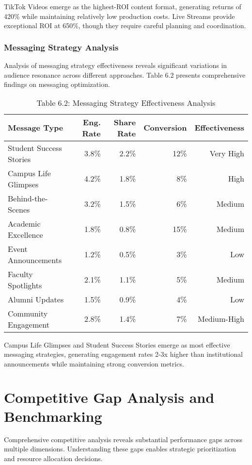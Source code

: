 \documentclass[12pt]{report}
\begin{document}
TikTok Videos emerge as the highest-ROI content format, generating returns of 420\% while maintaining relatively low production costs. Live Streams provide exceptional ROI at 650\%, though they require careful planning and coordination.

\subsection{Messaging Strategy Analysis}

Analysis of messaging strategy effectiveness reveals significant variations in audience resonance across different approaches. Table 6.2 presents comprehensive findings on messaging optimization.

\begin{table}[h]
\centering
\caption{Table 6.2: Messaging Strategy Effectiveness Analysis}
\begin{tabular}{@{}lrrrr@{}}
\toprule
\textbf{Message Type} & \textbf{Eng. Rate} & \textbf{Share Rate} & \textbf{Conversion} & \textbf{Effectiveness} \\
\midrule
Student Success Stories & 3.8\% & 2.2\% & 12\% & Very High \\
Campus Life Glimpses & 4.2\% & 1.8\% & 8\% & High \\
Behind-the-Scenes & 3.2\% & 1.5\% & 6\% & Medium \\
Academic Excellence & 1.8\% & 0.8\% & 15\% & Medium \\
Event Announcements & 1.2\% & 0.5\% & 3\% & Low \\
Faculty Spotlights & 2.1\% & 1.1\% & 5\% & Medium \\
Alumni Updates & 1.5\% & 0.9\% & 4\% & Low \\
Community Engagement & 2.8\% & 1.4\% & 7\% & Medium-High \\
\bottomrule
\end{tabular}
\end{table}

Campus Life Glimpses and Student Success Stories emerge as most effective messaging strategies, generating engagement rates 2-3x higher than institutional announcements while maintaining strong conversion metrics.

\chapter{Competitive Gap Analysis and Benchmarking}

Comprehensive competitive analysis reveals substantial performance gaps across multiple dimensions. Understanding these gaps enables strategic prioritization and resource allocation decisions.
\end{document}
